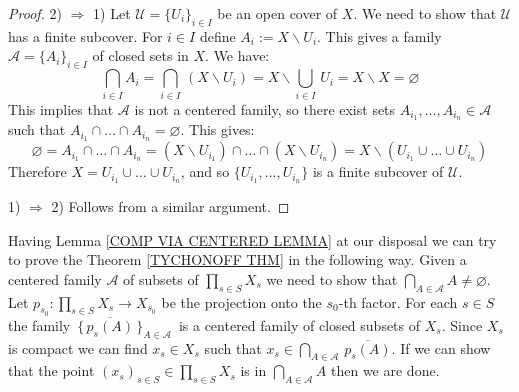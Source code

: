 \documentclass[11pt, letterpaper, oneside]{report}
\theoremstyle{pplain}
\newtheorem{ITERMVALUE THM}[theorem]{Intermediate Value Theorem}
\newtheorem{HEINEBOREL THM}[theorem]{Heine-Borel Theorem}
\newtheorem{UMETR THM}[theorem]{Urysohn Metrization Theorem}
\newtheorem{UMETR2 THM}[theorem]{Urysohn Metrization Theorem (v.2)}
\theoremstyle{ddefinition}
\theoremstyle{nnn}
\newtheorem{TDA NN}[theorem]{Topological Data Analysis. }
\theoremstyle{eexercise}
\newcommand{\Ra}{\Rightarrow}
\renewcommand{\AA}{{\mathcal A}}
\newcommand{\UU}{{\mathcal U}}
\newcommand{\ssmin}{\smallsetminus}
\begin{document}
\begin{proof}
2) $\Ra$ 1) Let  $\UU = \{U_{i}\}_{i\in I}$ be an open cover of $X$. We need to show that 
$\UU$ has a finite subcover. For $i\in I $ define $A_{i} := X\ssmin U_{i}$.  This gives a 
family $\AA = \{A_{i}\}_{i\in I}$ of closed sets in $X$. We have:
$$\bigcap_{i\in I} A_{i} = \bigcap_{i\in I} \,(X\ssmin U_{i}) = X \ssmin \bigcup_{i\in I} \, U_{i}  = 
X\ssmin X = \varnothing$$
This implies  that $\AA$ is not a centered family, so 
there exist sets $A_{i_{1}}, \dots, A_{i_{n}} \in \AA$ such that  
$A_{i_{1}}\cap \dots \cap A_{i_{n}}  = \varnothing$. This gives:
$$\varnothing = A_{i_{1}}\cap \dots \cap A_{i_{n}}  
= (X\ssmin U_{i_{1}})\cap \dots \cap (X\ssmin U_{i_{n}}) 
= X \ssmin (U_{i_{1}}\cup \dots \cup U_{i_{n}})$$
Therefore $X = U_{i_{1}}\cup \dots \cup U_{i_{n}}$, and so $\{U_{i_{1}}, \dots, U_{i_{n}}\}$ is 
a finite subcover of  $\UU$. 


1) $\Ra$ 2)  Follows from a similar argument. 
\end{proof}

Having  Lemma \ref{COMP VIA CENTERED LEMMA}  at our disposal 
we can try to prove the  Theorem \ref{TYCHONOFF THM} in the following way. Given a  centered 
family $\AA$ of subsets of $\prod_{s\in S}X_{s}$ we need to show that $\bigcap_{A\in \AA} A \neq \varnothing$. 
Let $p_{s_{0}}\colon \prod_{s\in S} X_{s} \to X_{s_{0}}$ be the projection onto the $s_{0}$-th factor.  
For each $s\in S$ the family $\, \{\, \overline{p_{s}(A)}\, \}_{A\in \AA}\,$ is a centered family of closed subsets  
of $X_{s}$. Since $X_{s}$ is  compact  we can find $x_{s}\in X_{s}$ such that 
$x_{s}\in \bigcap_{A\in \AA} \, \overline{p_{s}(A)}$. If we can show that the point 
$(x_{s})_{s\in S}\in \prod_{s\in S} X_{s}$ is in  $\bigcap_{A\in \AA} A$ then we are done. 
\end{document}
